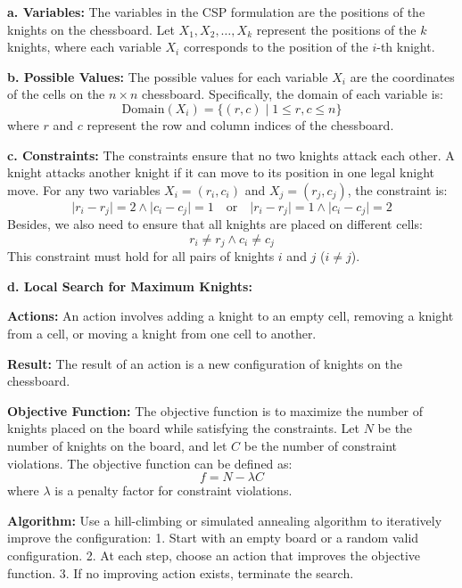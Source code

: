 \documentclass[cn,12pt]{homework}
\begin{document}
\begin{solution}

\textbf{a. Variables:}  
The variables in the CSP formulation are the positions of the knights on the chessboard. Let \(X_1, X_2, \dots, X_k\) represent the positions of the \(k\) knights, where each variable \(X_i\) corresponds to the position of the \(i\)-th knight.

\textbf{b. Possible Values:}  
The possible values for each variable \(X_i\) are the coordinates of the cells on the \(n \times n\) chessboard. Specifically, the domain of each variable is:
\[
\text{Domain}(X_i) = \{(r, c) \mid 1 \leq r, c \leq n\}
\]
where \(r\) and \(c\) represent the row and column indices of the chessboard.

\textbf{c. Constraints:}  
The constraints ensure that no two knights attack each other. A knight attacks another knight if it can move to its position in one legal knight move. For any two variables \(X_i = (r_i, c_i)\) and \(X_j = (r_j, c_j)\), the constraint is:
\[
\lvert r_i - r_j \rvert = 2 \land \lvert c_i - c_j \rvert = 1 \quad \text{or} \quad \lvert r_i - r_j \rvert = 1 \land \lvert c_i - c_j \rvert = 2
\]
Besides, we also need to ensure that all knights are placed on different cells:
\[
r_i \neq r_j \land c_i \neq c_j 
\]
This constraint must hold for all pairs of knights \(i\) and \(j\) (\(i \neq j\)).

\textbf{d. Local Search for Maximum Knights:}  

 \textbf{Actions:}  
  An action involves adding a knight to an empty cell, removing a knight from a cell, or moving a knight from one cell to another.

 \textbf{Result:}  
  The result of an action is a new configuration of knights on the chessboard.

 \textbf{Objective Function:}  
  The objective function is to maximize the number of knights placed on the board while satisfying the constraints. Let \(N\) be the number of knights on the board, and let \(C\) be the number of constraint violations. The objective function can be defined as:
  \[
  f = N - \lambda C
  \]
  where \(\lambda\) is a penalty factor for constraint violations.

 \textbf{Algorithm:}  
  Use a hill-climbing or simulated annealing algorithm to iteratively improve the configuration:
  1. Start with an empty board or a random valid configuration.
  2. At each step, choose an action that improves the objective function.
  3. If no improving action exists, terminate the search.


\end{solution}
\end{document}
